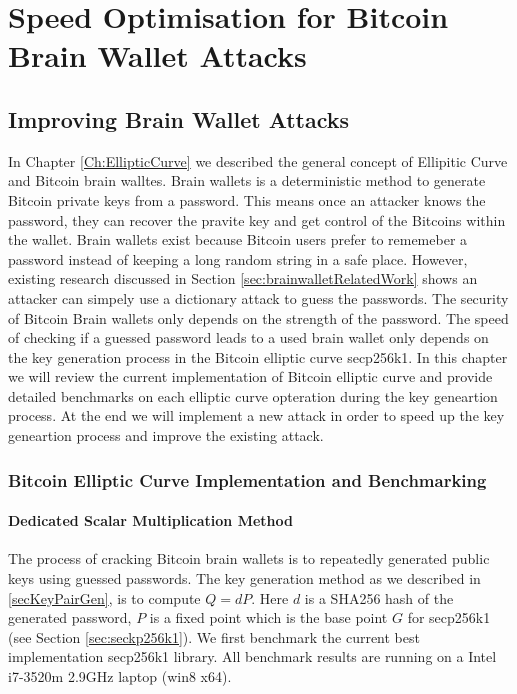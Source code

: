\part{Speed Optimisation for Bitcoin Brain Wallet Attacks} \label{Part3}


\chapter{Improving Brain Wallet Attacks}
In Chapter \ref{Ch:EllipticCurve} we described the general concept of Ellipitic Curve and Bitcoin brain walltes. Brain wallets is a deterministic method to generate Bitcoin private keys from a password. This means once an attacker knows the password, they can recover the pravite key and get control of the Bitcoins within the wallet. Brain wallets exist because Bitcoin users prefer  to rememeber a password instead of keeping a long random string in a safe place. However, existing research discussed in Section \ref{sec:brainwalletRelatedWork} shows an attacker can simpely use a dictionary attack to guess the passwords. The security of Bitcoin Brain wallets only depends on the strength of the password. The  speed of checking if a guessed password leads to a used brain wallet only depends on the key generation process in the Bitcoin elliptic curve secp256k1. In this chapter we will review the current implementation of Bitcoin elliptic curve and provide detailed benchmarks on each elliptic curve opteration during the key geneartion process. At the end we will implement a new attack in order to speed up the key geneartion process and improve the existing attack.
\section{Bitcoin Elliptic Curve Implementation and Benchmarking}
\subsection{Dedicated Scalar Multiplication Method} \label {sec:specialMethod}
The process of cracking Bitcoin brain wallets is to repeatedly generated public keys using guessed passwords. The key generation method as we described in \ref{secKeyPairGen}, is to compute $Q = dP$. Here $d$ is a SHA256 hash of the generated password, $P$ is a fixed point which is the base point $G$ for secp256k1 (see Section \ref{sec:seckp256k1}). We first benchmark the current best implementation secp256k1 library. All benchmark results are running on a Intel i7-3520m 2.9GHz laptop (win8 x64).

